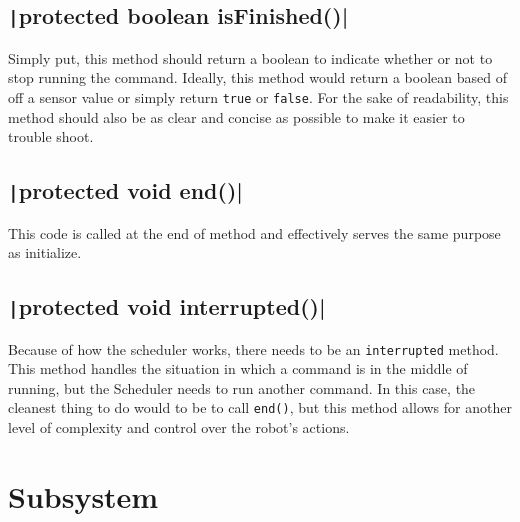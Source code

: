 \documentclass[11pt,fleqn]{article}
\newcommand{\mil}[2][java]{\texttt|#2|}
\begin{document}
\subsection{\mil{protected boolean isFinished()}}
Simply put, this method should return a boolean to indicate whether or not to stop running the
command. Ideally, this method would return a boolean based of off a sensor value or simply return
\texttt{true} or \texttt{false}. For the sake of readability, this method should also be as clear
and concise as possible to make it easier to trouble shoot. 

\subsection{\mil{protected void end()}}
This code is called at the end of method and effectively serves the same purpose as initialize.

\subsection{\mil{protected void interrupted()}}
Because of how the scheduler works, there needs to be an \texttt{interrupted} method. This method
handles the situation in which a command is in the middle of running, but the Scheduler needs to run
another command. In this case, the cleanest thing to do would to be to call \texttt{end()}, but this
method allows for another level of complexity and control over the robot's actions.

\section{Subsystem}
\end{document}
